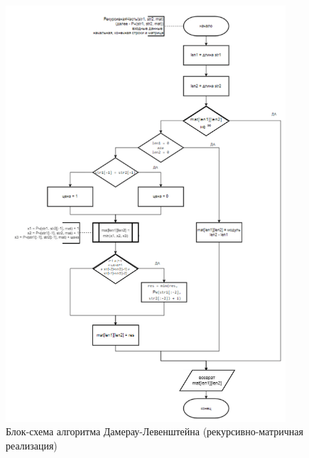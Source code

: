 \begin{figure}[H]
    \centering
    \includegraphics[width=0.93\textwidth]{img/block_2_3_1.png}
    \caption{Блок-схема алгоритма Дамерау-Левенштейна (рекурсивно-матричная\\ реализация)}
    \label{fig:block_2_3_1}
\end{figure}

